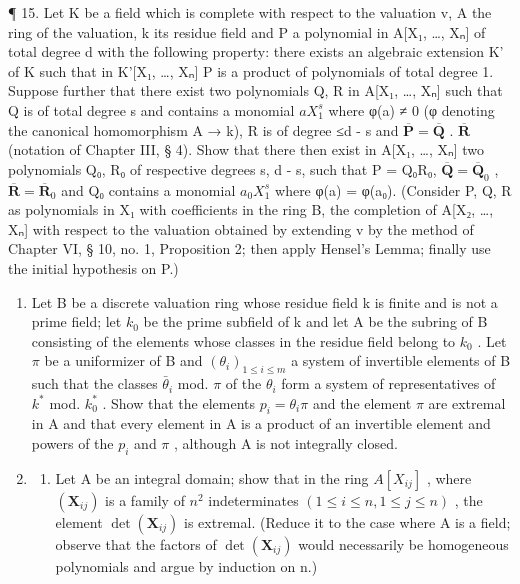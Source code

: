 ¶ 15. Let K be a field which is complete with respect to the valuation v, A the ring of the valuation, k its residue field and P a polynomial in A{[}X₁, \ldots, Xₙ{]} of total degree d with the following property: there exists an algebraic extension K' of K such that in K'{[}X₁, \ldots, Xₙ{]} P is a product of polynomials of total degree 1. Suppose further that there exist two polynomials Q, R in A{[}X₁, \ldots, Xₙ{]} such that Q is of total degree s and contains a monomial \(aX_1^{s}\) where φ(a) ≠ 0 (φ denoting the canonical homomorphism A → k), R is of degree ≤d - s and \(\overline{\mathbf{P}} = \overline{\mathbf{Q}}\) . \(\overline{\mathbf{R}}\) (notation of Chapter III, § 4). Show that there then exist in A{[}X₁, \ldots, Xₙ{]} two polynomials Q₀, R₀ of respective degrees s, d - s, such that P = Q₀R₀, \(\overline{\mathbf{Q}} = \overline{\mathbf{Q}}_0\) , \(\overline{\mathbf{R}} = \overline{\mathbf{R}}_0\) and Q₀ contains a monomial \(a_0X_1^{s}\) where φ(a) = φ(a₀). (Consider P, Q, R as polynomials in X₁ with coefficients in the ring B, the completion of A{[}X₂, \ldots, Xₙ{]} with respect to the valuation obtained by extending v by the method of Chapter VI, § 10, no. 1, Proposition 2; then apply Hensel's Lemma; finally use the initial hypothesis on P.)

\begin{enumerate}
\def\labelenumi{\arabic{enumi}.}
\setcounter{enumi}{15}
\item
  Let B be a discrete valuation ring whose residue field k is finite and is not a prime field; let \(k_{0}\) be the prime subfield of k and let A be the subring of B consisting of the elements whose classes in the residue field belong to \(k_{0}\) . Let \(\pi\) be a uniformizer of B and \((\theta_{i})_{1\leq i\leq m}\) a system of invertible elements of B such that the classes \(\bar{\theta}_{i}\) mod. \(\pi\) of the \(\theta_{i}\) form a system of representatives of \(k^{*}\) mod. \(k_{0}^{*}\) . Show that the elements \(p_{i}=\theta_{i}\pi\) and the element \(\pi\) are extremal in A and that every element in A is a product of an invertible element and powers of the \(p_{i}\) and \(\pi\) , although A is not integrally closed.
\item
  \begin{enumerate}
  \def\labelenumii{(\alph{enumii})}
  \tightlist
  \item
    Let A be an integral domain; show that in the ring \(A[X_{ij}]\) , where \((\mathbf{X}_{ij})\) is a family of \(n^{2}\) indeterminates \((1 \leqslant i \leqslant n, 1 \leqslant j \leqslant n)\) , the element \(\det(\mathbf{X}_{ij})\) is extremal. (Reduce it to the case where A is a field; observe that the factors of \(\det(\mathbf{X}_{ij})\) would necessarily be homogeneous polynomials and argue by induction on n.)
  \end{enumerate}
\end{enumerate}

